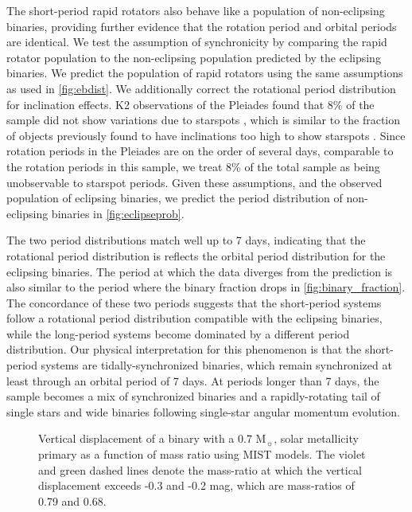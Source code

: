 \documentclass[manuscript]{aastex6}
\begin{document}
The short-period rapid rotators also behave like a population of non-eclipsing
binaries, providing further evidence that the rotation period and orbital
periods are identical. We test the assumption of synchronicity by comparing the
rapid rotator population to the non-eclipsing population predicted by the
eclipsing binaries. We predict the population of rapid rotators using the same
assumptions as used in \cref{fig:ebdist}. We additionally correct the rotational 
period distribution for inclination effects. K2 observations of the Pleiades 
found that 8\% of the sample did not show variations due to starspots 
\citep{Rebull17}, which is similar to the fraction of objects previously found 
to have inclinations too high to show starspots \citep{Jackson10}. Since 
rotation periods in the Pleiades are on the order of several days, comparable to 
the rotation periods in this sample, we treat 8\% of the total sample as being 
unobservable to starspot periods. Given these assumptions, and the observed 
population of eclipsing binaries, we predict the period distribution of 
non-eclipsing binaries in \cref{fig:eclipseprob}. 

The two period distributions match well up to 7 days, indicating
that the rotational period distribution is reflects the orbital period
distribution for the eclipsing binaries. The period at which the data diverges
from the prediction is also similar to the period where the binary fraction 
drops in \cref{fig:binary_fraction}. The concordance of these two periods 
suggests that the short-period systems follow a 
rotational period distribution compatible with the eclipsing binaries, while 
the long-period systems become dominated by a different 
period distribution. Our physical interpretation for this phenomenon is that the
short-period systems are tidally-synchronized binaries, which remain 
synchronized at least through an orbital period of 7 days. At periods longer
than 7 days, the sample becomes a mix of synchronized binaries and a 
rapidly-rotating tail of single stars and wide binaries following single-star angular momentum evolution.

\begin{figure}[htb]
    \centering
    \caption{Vertical displacement of a binary with a 0.7 M\(_\sun\), solar
    metallicity primary as a function of mass ratio using MIST models. The
violet and green dashed lines denote the mass-ratio at which the vertical
displacement exceeds -0.3 and -0.2  mag, which are mass-ratios of 0.79 and
0.68.}\label{fig:photometric_massratio}
\end{figure}
\end{document}
